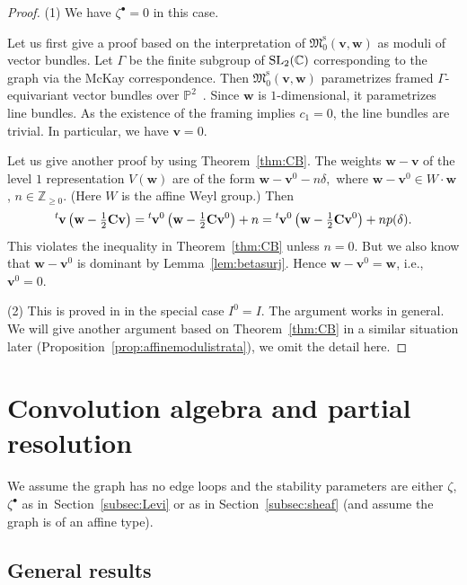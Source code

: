 \documentclass[11pt]{article}
\theoremstyle{definition}
\numberwithin{equation}{section}
\newcommand{\thmref}[1]{Theorem~\ref{#1}}
\newcommand{\lemref}[1]{Lemma~\ref{#1}}
\newcommand{\propref}[1]{Proposition~\ref{#1}}
\newcommand{\subsecref}[1]{Section~\ref{#1}}
\newcommand{\lsp}[2]{{\mskip-.3mu}{}^{#1}\mskip-1mu{#2}}
\newcommand{\C}{{\mathbb C}}
\newcommand{\Z}{{\mathbb Z}}
\newcommand{\proj}{{\mathbb P}}
\newcommand{\SL}{\operatorname{\rm SL}}
\newcommand{\M}{{\mathfrak M}} %
\newcommand{\Mreg}{\M^{\operatorname{s}}}
\newcommand{\bv}{{\mathbf v}} %
\newcommand{\bw}{{\mathbf w}} %
\newcommand{\bC}{{\mathbf C}} %
\begin{document}
\begin{proof}
(1) We have $\zeta^\bullet = 0$ in this case.

Let us f\/irst give a proof based on the interpretation of
$\Mreg_0(\bv,\bw)$ as moduli of vector bundles.
%
Let $\Gamma$ be the f\/inite subgroup of $\SL_2(\C)$ corresponding to
the graph via the McKay correspondence.
%
Then $\Mreg_0(\bv,\bw)$ parametrizes framed $\Gamma$-equivariant
vector bundles over $\proj^2$~\cite{Lecture}. Since $\bw$ is
$1$-dimensional, it parametrizes line bundles. As the existence of the
framing implies $c_1 = 0$, the line bundles are trivial. In
particular, we have $\bv = 0$.

Let us give another proof by using \thmref{thm:CB}. The weights $\bw -
\bv$ of the level $1$ representation $V(\bw)$ are of the form
\(
  \bw - \bv^0 - n\delta,
\)
where $\bw - \bv^0\in W\cdot \bw$, $n\in\Z_{\ge 0}$.
(Here $W$ is the af\/f\/ine Weyl group.)
Then
\[
   \lsp{t}{\bv}\left(\bw - \tfrac12 \bC \bv\right)
   = \lsp{t}{\bv^0}\left(\bw - \tfrac12 \bC \bv^0\right) + n
   = \lsp{t}{\bv^0}\left(\bw - \tfrac12 \bC \bv^0\right) + n p(\delta).
\]
This violates the inequality in \thmref{thm:CB} unless $n=0$. But we
also know that $\bw - \bv^0$ is dominant by \lemref{lem:betasurj}.
Hence $\bw - \bv^0 = \bw$, i.e., $\bv^0 = 0$.

(2) This is proved in \cite[10.5, 10.8]{Na-alg} in the special case
$I^0 = I$. The argument works in general. We will give another
argument based on \thmref{thm:CB} in a similar situation later
(\propref{prop:affinemodulistrata}), we omit the detail here.
\end{proof}


\setcounter{section}{4}
\setcounter{subsection}{0}
\setcounter{subsubsection}{0}
\setcounter{equation}{0}
\section{Convolution algebra and partial resolution}\label{sec:convolution}

We assume the graph has no edge loops and the stability parameters are
either $\zeta$, $\zeta^\bullet$ as in~\subsecref{subsec:Levi} or as in
\subsecref{subsec:sheaf} (and assume the graph is of an af\/f\/ine type).

\subsection{General results}
\end{document}
